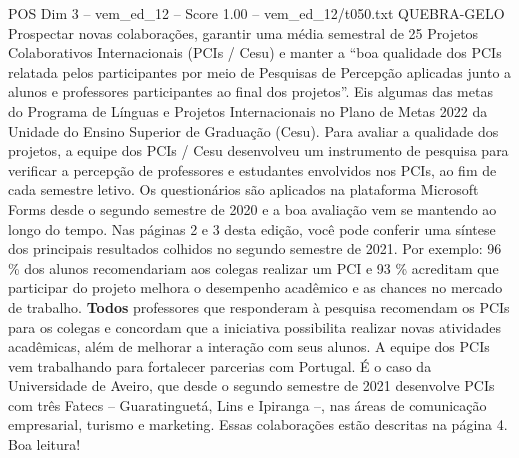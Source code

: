 \begin{textsample}{POS Dim 3 – vem\_ed\_12 – Score 1.00 – vem\_ed\_12/t050.txt}  \label{ex:f3_pos_042}
QUEBRA-GELO Prospectar novas colaborações, garantir uma média semestral de 25 Projetos Colaborativos Internacionais (PCIs / Cesu) e manter a “boa qualidade dos PCIs relatada pelos participantes por meio de Pesquisas de Percepção aplicadas junto a alunos e professores participantes ao final dos projetos”.
Eis algumas das metas do Programa de Línguas e Projetos Internacionais no Plano de Metas 2022 da Unidade do Ensino Superior de Graduação (Cesu).
Para avaliar a qualidade dos projetos, a equipe dos PCIs / Cesu desenvolveu um instrumento de pesquisa para verificar a percepção de professores e estudantes envolvidos nos PCIs, ao fim de cada semestre letivo.
Os questionários são aplicados na plataforma Microsoft Forms desde o segundo semestre de 2020 e a boa avaliação vem se mantendo ao longo do tempo.
Nas páginas 2 e 3 desta edição, você pode conferir uma síntese dos principais resultados colhidos no segundo semestre de 2021.
Por exemplo: 96 \% dos alunos recomendariam aos colegas realizar um PCI e 93 \% acreditam que participar do projeto melhora o desempenho acadêmico e as chances no mercado de trabalho. \textbf{Todos} professores que responderam à pesquisa recomendam os PCIs para os colegas e concordam que a iniciativa possibilita realizar novas atividades acadêmicas, além de melhorar a interação com seus alunos.
A equipe dos PCIs vem trabalhando para fortalecer parcerias com Portugal.
É o caso da Universidade de Aveiro, que desde o segundo semestre de 2021 desenvolve PCIs com três Fatecs – Guaratinguetá, Lins e Ipiranga –, nas áreas de comunicação empresarial, turismo e marketing.
Essas colaborações estão descritas na página 4.
Boa leitura!

\end{textsample}
